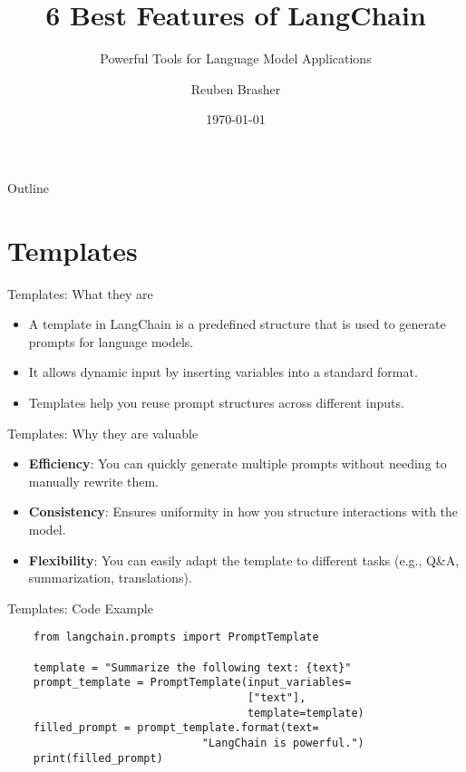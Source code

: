 \documentclass{beamer}
\title{6 Best Features of LangChain}
\subtitle{Powerful Tools for Language Model Applications}
\author{Reuben Brasher}
\date{\today}
\begin{document}
\begin{frame}
    \titlepage
\end{frame}

\begin{frame}{Outline}
    \tableofcontents
\end{frame}

\section{Templates}

\begin{frame}{Templates: What they are}
    \begin{itemize}
        \item A template in LangChain is a predefined structure that is used to generate prompts for language models.
        \item It allows dynamic input by inserting variables into a standard format.
        \item Templates help you reuse prompt structures across different inputs.
    \end{itemize}
\end{frame}

\begin{frame}{Templates: Why they are valuable}
    \begin{itemize}
        \item \textbf{Efficiency}: You can quickly generate multiple prompts without needing to manually rewrite them.
        \item \textbf{Consistency}: Ensures uniformity in how you structure interactions with the model.
        \item \textbf{Flexibility}: You can easily adapt the template to different tasks (e.g., Q\&A, summarization, translations).
    \end{itemize}
\end{frame}

\begin{frame}[fragile]{Templates: Code Example}
    \begin{verbatim}
    from langchain.prompts import PromptTemplate

    template = "Summarize the following text: {text}"
    prompt_template = PromptTemplate(input_variables=
                                     ["text"],
                                     template=template)
    filled_prompt = prompt_template.format(text=
                              "LangChain is powerful.")
    print(filled_prompt)
    \end{verbatim}
\end{frame}
\end{document}
